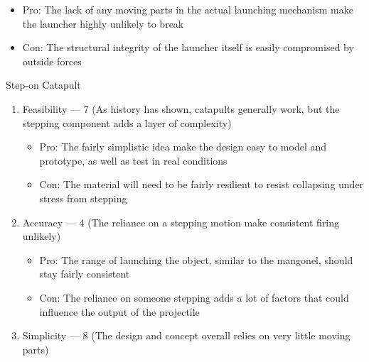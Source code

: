 \begin{enumerate}
    \begin{itemize}

      \item Pro: The lack of any moving parts in the actual launching mechanism make the launcher highly unlikely to break

      \item Con: The structural integrity of the launcher itself is easily compromised by outside forces

    \end{itemize}

\end{enumerate}

\begin{center}
  Step-on Catapult
\end{center}

\begin{enumerate}

  \item Feasibility — 7 (As history has shown, catapults generally work, but the stepping component adds a layer of complexity)

    \begin{itemize}

      \item Pro: The fairly simplistic idea make the design easy to model and prototype, as well as test in real conditions

      \item Con: The material will need to be fairly resilient to resist collapsing under stress from stepping

    \end{itemize}

  \item Accuracy — 4 (The reliance on a stepping motion make consistent firing unlikely)

    \begin{itemize}

      \item Pro: The range of launching the object, similar to the mangonel, should stay fairly consistent

      \item Con: The reliance on someone stepping adds a lot of factors that could influence the output of the projectile

    \end{itemize}

  \item Simplicity — 8 (The design and concept overall relies on very little moving parts)


\end{enumerate}
